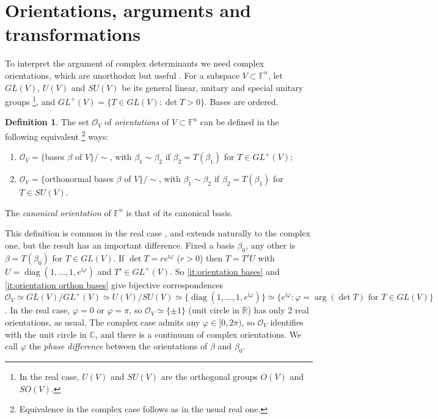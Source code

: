 \documentclass{birkjour}
\newcommand{\CITE}[1]{\todo[color=cyan!30]{#1}}  %
\theoremstyle{definition}
\newtheorem{definition}[theorem]{Definition}
\def\R			{\mathds{R}}
\def\C			{\mathds{C}}
\def\F			{\mathds{F}}
\def\OO			{\mathcal{O}}
\def\im	 					{\mathrm{i}}				%
\DeclareMathOperator{\diag}{diag}
\begin{document}
\section{Orientations, arguments and  transformations}\label{sc:Complex orientation}

To interpret the argument of complex determinants we need complex orientations, which are unorthodox but useful \cite{Mandolesi_Contractions}.
For a subspace $V \subset \F^n$, let
$GL(V)$, $U(V)$ and $SU(V)$ be its general linear, unitary and special unitary groups%
\footnote{In the real case, $U(V)$ and $SU(V)$ are the orthogonal groups $O(V)$ and $SO(V)$.}, and
$GL^+(V) = \{T\in GL(V):\det T>0\}$.
Bases are ordered.


\begin{definition}\label{df:orientation}
	The set $\OO_V$ of \emph{orientations} of $V \subset \F^n$ can be defined in the following equivalent%
		\footnote{Equivalence in the complex case follows as in the usual real one.}
	ways:
	\begin{enumerate}[label = (\roman*)]
		\item $\OO_V = \{$bases $\beta$ of $V\}/\!\sim$, with $\beta_1 \sim \beta_2$ if $\beta_2 = T(\beta_1)$ for $T \in GL^+(V)$;\label{it:orientation bases}
		
		\item $\OO_V = \{$orthonormal bases $\beta$ of $V\}/\!\sim$, with $\beta_1 \sim \beta_2$ if $\beta_2 = T(\beta_1)$ for $T \in SU(V)$. \label{it:orientation orthon bases}
%		
	\end{enumerate}
	The \emph{canonical orientation} of $\F^n$ is that of its canonical basis.
\end{definition}

This definition is common in the real case \cite{Shafarevich2013},
\CITE{Shaw p.348}
and extends naturally to the complex one, but the result has an important difference.
Fixed a basis $\beta_0$, any other is $\beta = T(\beta_0)$ for $T\in GL(V)$.
If $\det T = r e^{\im \varphi}$ ($r>0$) 
then $T = T' U$ with $U = \diag(1,\ldots,1,e^{\im \varphi})$ and $T' \in GL^+(V)$.
So \ref{it:orientation bases} and \ref{it:orientation orthon bases} give bijective correspondences
$\OO_V \simeq GL(V)/GL^+(V) \simeq U(V)/SU(V) \simeq \{\diag(1,\ldots,1,e^{\im \varphi})\} \simeq \{e^{\im \varphi} : \varphi = \arg(\det T) \text{ for } T \in GL(V)\}$.
%	
%
In the real case,
$\varphi = 0$ or $\varphi = \pi$, so $\OO_V \simeq \{\pm 1\}$ (unit circle in $\R$) has only 2 real orientations, as usual.
The complex case admits any $\varphi\in [0,2\pi)$, so $\OO_V$ identifies with the unit circle in $\C$, and there is a continuum of complex orientations.
We call $\varphi$ the \emph{phase difference} between the orientations of $\beta$ and $\beta_0$.
\end{document}
